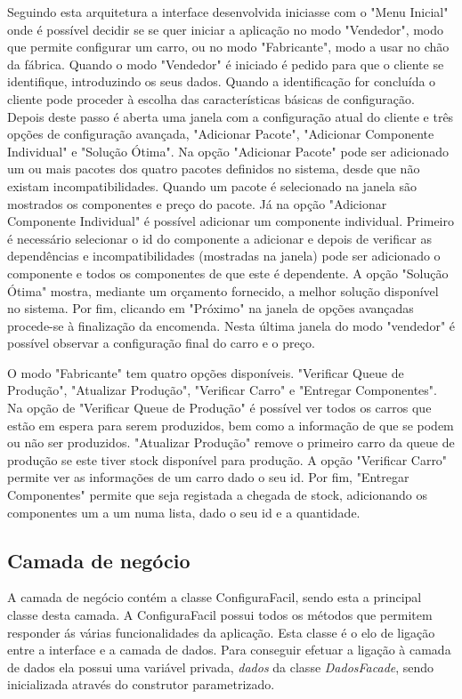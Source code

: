 \documentclass{llncs}
\begin{document}
Seguindo esta arquitetura a interface desenvolvida iniciasse com o "Menu Inicial" onde é possível decidir se se quer iniciar a aplicação no modo "Vendedor", modo que permite configurar um carro, ou no modo "Fabricante", modo a usar no chão da fábrica.
Quando o modo "Vendedor" é iniciado é pedido para que o cliente se identifique, introduzindo os seus dados. Quando a identificação for concluída o cliente pode proceder à escolha das características básicas de configuração. Depois deste passo é aberta uma janela com a configuração atual do cliente e três opções de configuração avançada, "Adicionar Pacote", "Adicionar Componente Individual" e "Solução Ótima". Na opção "Adicionar Pacote" pode ser adicionado um ou mais pacotes dos quatro pacotes definidos no sistema, desde que não existam incompatibilidades. Quando um pacote é selecionado na janela são mostrados os componentes e preço do pacote. Já na opção "Adicionar Componente Individual" é possível adicionar um componente individual. Primeiro é necessário selecionar o id do componente a adicionar e depois de verificar as dependências e incompatibilidades (mostradas na janela) pode ser adicionado o componente e todos os componentes de que este é dependente. A opção "Solução Ótima" mostra, mediante um orçamento fornecido, a melhor solução disponível no sistema. Por fim, clicando em "Próximo" na janela de opções avançadas procede-se à finalização da encomenda. Nesta última janela do modo "vendedor" é possível observar a configuração final do carro e o preço.

O modo "Fabricante" tem quatro opções disponíveis. "Verificar Queue de Produção", "Atualizar Produção", "Verificar Carro" e "Entregar Componentes". Na opção de "Verificar Queue de Produção" é possível ver todos os carros que estão em espera para serem produzidos, bem como a informação de que se podem ou não ser produzidos. "Atualizar Produção" remove o primeiro carro da queue de produção se este tiver stock disponível para produção. A opção "Verificar Carro" permite ver as informações de um carro dado o seu id. Por fim, "Entregar Componentes" permite que seja registada a chegada de stock, adicionando os componentes um a um numa lista, dado o seu id e a quantidade.

\subsection{Camada de negócio}

A camada de negócio contém a classe ConfiguraFacil, sendo esta a principal classe desta camada. A ConfiguraFacil possui todos os métodos que permitem responder ás várias funcionalidades da aplicação. Esta classe é o elo de ligação entre a interface e a camada de dados. Para conseguir efetuar a ligação à camada de dados ela possui uma variável privada, \textit{dados} da classe \textit{DadosFacade}, sendo inicializada através do construtor parametrizado.
\end{document}
